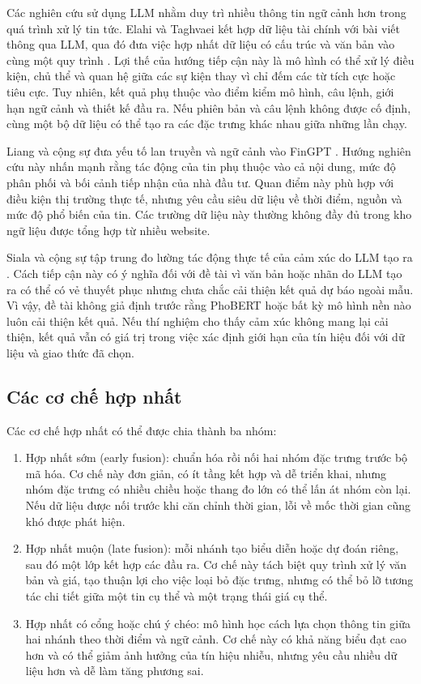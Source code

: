 \documentclass[12pt, a4paper, oneside]{report}
\begin{document}
Các nghiên cứu sử dụng LLM nhằm duy trì nhiều thông tin ngữ cảnh hơn trong quá trình
xử lý tin tức. Elahi và Taghvaei kết hợp dữ liệu tài chính với bài viết thông qua LLM,
qua đó đưa việc hợp nhất dữ liệu có cấu trúc và văn bản vào cùng một quy trình
\cite{Elahi2024_241101368v1}. Lợi thế của hướng tiếp cận này là mô hình có thể xử lý
điều kiện, chủ thể và quan hệ giữa các sự kiện thay vì chỉ đếm các từ tích cực hoặc
tiêu cực. Tuy nhiên, kết quả phụ thuộc vào điểm kiểm mô hình, câu lệnh, giới hạn ngữ
cảnh và thiết kế đầu ra. Nếu phiên bản và câu lệnh không được cố định, cùng một bộ dữ
liệu có thể tạo ra các đặc trưng khác nhau giữa những lần chạy.

Liang và cộng sự đưa yếu tố lan truyền và ngữ cảnh vào FinGPT
\cite{Liang2024_241210823v2}. Hướng nghiên cứu này nhấn mạnh rằng tác động của tin phụ
thuộc vào cả nội dung, mức độ phân phối và bối cảnh tiếp nhận của nhà đầu tư. Quan điểm
này phù hợp với điều kiện thị trường thực tế, nhưng yêu cầu siêu dữ liệu về thời điểm,
nguồn và mức độ phổ biến của tin. Các trường dữ liệu này thường không đầy đủ trong kho
ngữ liệu được tổng hợp từ nhiều website.

Siala và cộng sự tập trung đo lường tác động thực tế của cảm xúc do LLM tạo ra
\cite{Siala2026_260200086v3}. Cách tiếp cận này có ý nghĩa đối với đề tài vì văn bản
hoặc nhãn do LLM tạo ra có thể có vẻ thuyết phục nhưng chưa chắc cải thiện kết quả dự
báo ngoài mẫu. Vì vậy, đề tài không giả định trước rằng PhoBERT hoặc bất kỳ mô hình nền
nào luôn cải thiện kết quả. Nếu thí nghiệm cho thấy cảm xúc không mang lại cải thiện,
kết quả vẫn có giá trị trong việc xác định giới hạn của tín hiệu đối với dữ liệu và
giao thức đã chọn.

\subsection{Các cơ chế hợp nhất}

Các cơ chế hợp nhất có thể được chia thành ba nhóm:

\begin{enumerate}[nosep]
  \item Hợp nhất sớm (early fusion): chuẩn hóa rồi nối hai nhóm đặc trưng trước bộ mã hóa.
    Cơ chế này đơn giản, có ít tầng kết hợp và dễ triển khai, nhưng nhóm đặc trưng có
    nhiều chiều hoặc thang đo lớn có thể lấn át nhóm còn lại. Nếu dữ liệu được nối trước
    khi căn chỉnh thời gian, lỗi về mốc thời gian cũng khó được phát hiện.
  \item Hợp nhất muộn (late fusion): mỗi nhánh tạo biểu diễn hoặc dự đoán riêng, sau đó một
    lớp kết hợp các đầu ra. Cơ chế này tách biệt quy trình xử lý văn bản và giá, tạo
    thuận lợi cho việc loại bỏ đặc trưng, nhưng có thể bỏ lỡ tương tác chi tiết giữa
    một tin cụ thể và một trạng thái giá cụ thể.
  \item Hợp nhất có cổng hoặc chú ý chéo: mô hình học cách lựa chọn thông tin
    giữa hai nhánh theo thời điểm và ngữ cảnh. Cơ chế này có khả năng biểu đạt cao hơn
    và có thể giảm ảnh hưởng của tín hiệu nhiễu, nhưng yêu cầu nhiều dữ liệu hơn và dễ
    làm tăng phương sai.
\end{enumerate}
\end{document}
